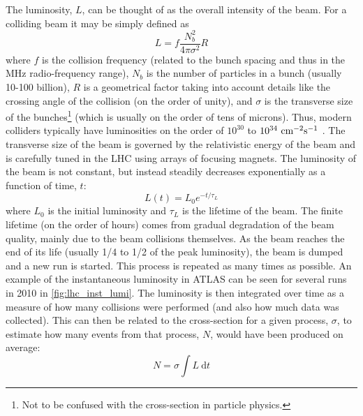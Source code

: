 The luminosity, $L$,  can be thought of as the overall intensity of the beam.
For a colliding beam it may be simply defined as
\begin{equation}
L=f \frac{N_b^2}{4\pi\sigma^2} R
\end{equation}
where $f$ is the collision frequency (related to the bunch spacing and thus
in the MHz radio-frequency range), 
$N_b$ is the number of particles in a bunch (usually 10-100 billion), 
$R$ is a  geometrical factor
taking into account details like the crossing angle of the collision (on the
order of unity),
and $\sigma$ is the transverse size of the bunches\footnote{Not to be confused
with the cross-section in particle physics.} (which 
is usually on the order of tens of microns).
Thus, modern colliders typically have luminosities on the order of 
$10^{30}$ to $10^{34}~\textrm{cm}^{-2}\textrm{s}^{-1}$ \cite{PDG:2014}.
The transverse size of the beam is governed by the relativistic 
energy of the beam and is carefully tuned in the LHC
using arrays of focusing magnets. 
The luminosity of the beam is not constant, but instead steadily decreases
exponentially as a function of time, $t$:
\begin{equation}
L(t) = L_0 e^{-t/\tau_L} 
\label{eq:lhc_lumi}
\end{equation}
where $L_0$ is the initial luminosity and $\tau_L$ is the lifetime of the 
beam. The finite lifetime (on the order of hours) comes from gradual 
degradation of the beam quality, mainly due to the beam collisions themselves.
As the beam reaches the end of its 
life (usually 1/4 to 1/2 of the peak luminosity), the beam is dumped and a new
run is started. This process is repeated as many times as possible. 
An example of the instantaneous luminosity in ATLAS can be seen for
several runs in 2010 in \fig\ref{fig:lhc_inst_lumi}.
The luminosity is then integrated over time as a measure of how many collisions
were performed (and also how much data was collected).  This can
then be related to the cross-section for a given process, $\sigma$, to estimate
how many events from that process, $N$, would have been produced on average:
\begin{equation}
N=\sigma \int L~ \textrm{d}t
\label{eq:lhc_nevents}
\end{equation}

